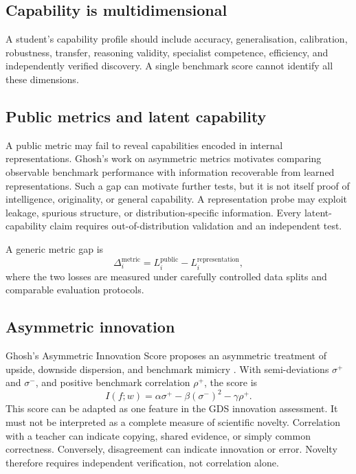\documentclass[11pt,a4paper]{article}
\begin{document}
\subsection{Capability is multidimensional}

A student's capability profile should include accuracy, generalisation, calibration, robustness, transfer, reasoning validity, specialist competence, efficiency, and independently verified discovery. A single benchmark score cannot identify all these dimensions.

\subsection{Public metrics and latent capability}

A public metric may fail to reveal capabilities encoded in internal representations. Ghosh's work on asymmetric metrics motivates comparing observable benchmark performance with information recoverable from learned representations. Such a gap can motivate further tests, but it is not itself proof of intelligence, originality, or general capability. A representation probe may exploit leakage, spurious structure, or distribution-specific information. Every latent-capability claim requires out-of-distribution validation and an independent test.

A generic metric gap is
\begin{equation}
\Delta_i^{\mathrm{metric}}
=
L_i^{\mathrm{public}}-L_i^{\mathrm{representation}},
\end{equation}
where the two losses are measured under carefully controlled data splits and comparable evaluation protocols.

\subsection{Asymmetric innovation}

Ghosh's Asymmetric Innovation Score proposes an asymmetric treatment of upside, downside dispersion, and benchmark mimicry \cite{ghosh2026innovation}. With semi-deviations \(\sigma^+\) and \(\sigma^-\), and positive benchmark correlation \(\rho^+\), the score is
\begin{equation}
I(f;w)=\alpha\sigma^+-\beta(\sigma^-)^2-\gamma\rho^+.
\end{equation}
This score can be adapted as one feature in the GDS innovation assessment. It must not be interpreted as a complete measure of scientific novelty. Correlation with a teacher can indicate copying, shared evidence, or simply common correctness. Conversely, disagreement can indicate innovation or error. Novelty therefore requires independent verification, not correlation alone.
\end{document}
